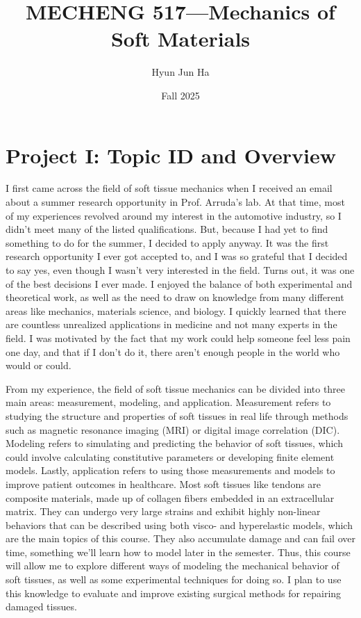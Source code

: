 \documentclass{article}
\title{MECHENG 517---Mechanics of Soft Materials}
\author{Hyun Jun Ha}
\date {Fall 2025}
\begin{document}
\maketitle

\section*{Project I: Topic ID and Overview}

I first came across the field of soft tissue mechanics when I received an email about a summer research opportunity in Prof. Arruda's lab. At that time, most of my experiences revolved around my interest in the automotive industry, so I didn't meet many of the listed qualifications. But, because I had yet to find something to do for the summer, I decided to apply anyway. It was the first research opportunity I ever got accepted to, and I was so grateful that I decided to say yes, even though I wasn't very interested in the field. Turns out, it was one of the best decisions I ever made. I enjoyed the balance of both experimental and theoretical work, as well as the need to draw on knowledge from many different areas like mechanics, materials science, and biology. I quickly learned that there are countless unrealized applications in medicine and not many experts in the field. I was motivated by the fact that my work could help someone feel less pain one day, and that if I don't do it, there aren't enough people in the world who would or could.

From my experience, the field of soft tissue mechanics can be divided into three main areas: measurement, modeling, and application. Measurement refers to studying the structure and properties of soft tissues in real life through methods such as magnetic resonance imaging (MRI) or digital image correlation (DIC). Modeling refers to simulating and predicting the behavior of soft tissues, which could involve calculating constitutive parameters or developing finite element models. Lastly, application refers to using those measurements and models to improve patient outcomes in healthcare. Most soft tissues like tendons are composite materials, made up of collagen fibers embedded in an extracellular matrix. They can undergo very large strains and exhibit highly non-linear behaviors that can be described using both visco- and hyperelastic models, which are the main topics of this course. They also accumulate damage and can fail over time, something we'll learn how to model later in the semester. Thus, this course will allow me to explore different ways of modeling the mechanical behavior of soft tissues, as well as some experimental techniques for doing so. I plan to use this knowledge to evaluate and improve existing surgical methods for repairing damaged tissues.
\end{document}
